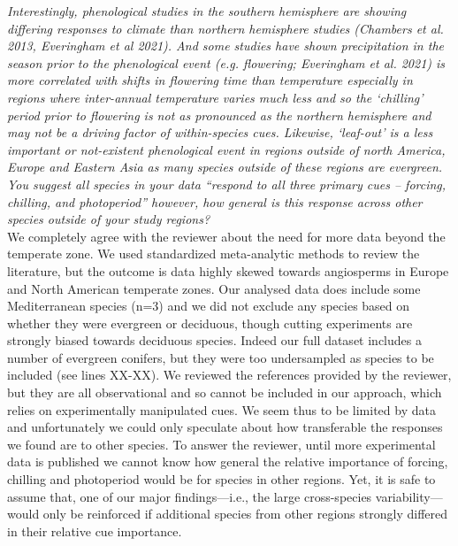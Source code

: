 \documentclass[11pt]{article}
\begin{document}
\emph{Interestingly, phenological studies in the southern hemisphere are showing differing responses to climate than northern hemisphere studies (Chambers et al. 2013, Everingham et al 2021). And some studies have shown precipitation in the season prior to the phenological event (e.g. flowering; Everingham et al. 2021) is more correlated with shifts in flowering time than temperature especially in regions where inter-annual temperature varies much less and so the ‘chilling’ period prior to flowering is not as pronounced as the northern hemisphere and may not be a driving factor of within-species cues. Likewise, ‘leaf-out’ is a less important or not-existent phenological event in regions outside of north America, Europe and Eastern Asia as many species outside of these regions are evergreen. You suggest all species in your data “respond to all three primary cues – forcing, chilling, and photoperiod” however, how general is this response across other species outside of your study regions?}\\


We completely agree with the reviewer about the need for more data beyond the temperate zone. We used standardized meta-analytic methods to review the literature, but the outcome is data highly skewed towards angiosperms in Europe and North American temperate zones. Our analysed data does include some Mediterranean species (n=3) and we did not exclude any species based on whether they were evergreen or deciduous, though cutting experiments are strongly biased towards deciduous species. Indeed our full dataset includes a number of evergreen conifers, but they were too undersampled as species to be included (see lines XX-XX). We reviewed the references provided by the reviewer, but they are all observational and so cannot be included in our approach, which relies on experimentally manipulated cues. We seem thus to be limited by data and unfortunately we could only speculate about how transferable the responses we found are to other species. To answer the reviewer, until more experimental data is published we cannot know how general the relative importance of forcing, chilling and photoperiod would be for species in other regions. Yet, it is safe to assume that, one of our major findings---i.e., the large cross-species variability---would only be reinforced if additional species from other regions strongly differed in their relative cue importance.\\
\end{document}
